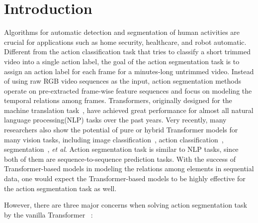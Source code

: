 \documentclass{bmvc2k}
\def\etal{\emph{et al}\bmvaOneDot}
\begin{document}
\section{Introduction}
\label{sec:intro}
Algorithms for automatic detection and segmentation of human activities are crucial for applications such as home security, healthcare, and robot automatic. Different from the action classification task that tries to classify a short trimmed video into a single action label, the goal of the action segmentation task is to assign an action label for each frame for a minutes-long untrimmed video. Instead of using raw RGB video sequences as the input, action segmentation methods operate on pre-extracted frame-wise feature sequences and focus on modeling the temporal relations among frames. 
Transformers, originally designed for the machine translation task~\cite{att_all_you_need}, have achieved great performance for almost all natural language processing(NLP) tasks over the past years. Very recently, many researchers also show the potential of pure or hybrid Transformer models for many vision tasks, including image classification~\cite{transformer_cls1,transformer_cls2,transformer_cls3,transformer_cls4,transformer_cls5}, action classification~\cite{transformer_action1}, segmentation~\cite{transformer_seg1,transformer_seg2,transformer_seg3}, \etal. Action segmentation task is similar to NLP tasks, since both of them are sequence-to-sequence prediction tasks. With the success of Transformer-based models in modeling the relations among elements in sequential data, one would expect the Transformer-based models to be highly effective for the action segmentation task as well.

However, there are three major concerns when solving action segmentation task by the vanilla Transformer~\cite{att_all_you_need} :
\end{document}
